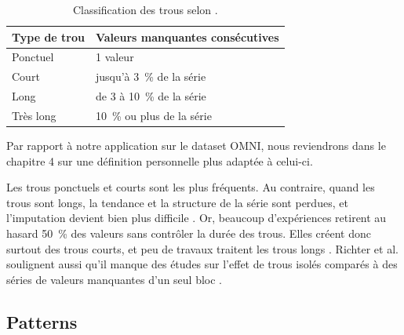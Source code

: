 \begin{table}[h]
\centering
\begin{tabular}{|l|l|}
\hline
\textbf{Type de trou} & \textbf{Valeurs manquantes consécutives} \\ \hline
Ponctuel & 1 valeur \\ \hline
Court & jusqu’à 3~\% de la série \\ \hline
Long & de 3 à 10~\% de la série \\ \hline
Très long & 10~\% ou plus de la série \\ \hline
\end{tabular}
\caption{Classification des trous selon \cite{Adhikari_2023}.}
\label{tab:gaps}
\end{table}
Par rapport à notre application sur le dataset OMNI, nous reviendrons dans le chapitre 4 sur une définition personnelle plus adaptée à celui-ci. 


Les trous ponctuels et courts sont les plus fréquents. Au contraire, quand les trous sont longs, la tendance et la structure de la série sont perdues, et l’imputation devient bien plus difficile \cite{Adhikari_2023}. Or, beaucoup d’expériences retirent au hasard 50~\% des valeurs sans contrôler la durée des trous. Elles créent donc surtout des trous courts, et peu de travaux traitent les trous longs \cite{Adhikari_2023}. Richter et al. soulignent aussi qu’il manque des études sur l’effet de trous isolés comparés à des séries de valeurs manquantes d’un seul bloc \cite{Richter_2024}.

\subsection{Patterns}

